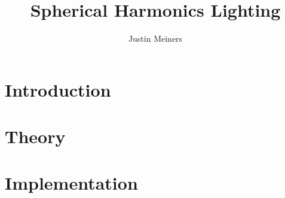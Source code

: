 \documentclass[11pt,letterpaper]{article}
\begin{document}
\title{Spherical Harmonics Lighting}
\author{Justin Meiners}

\maketitle

\section{Introduction}

\section{Theory}

\section{Implementation}
\end{document}

